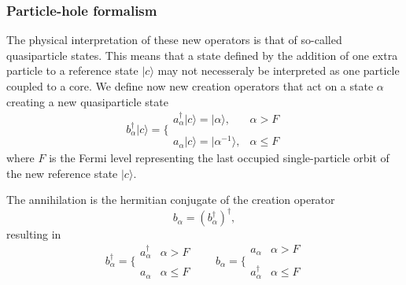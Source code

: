 \documentclass{beamer}
\begin{document}
\begin{frame}
\frametitle{Particle-hole formalism}

\begin{block}{}
The physical interpretation of these new operators is that of so-called quasiparticle states.
This means that a state defined by the addition of one extra particle to a reference state $|c\rangle $ may not necesseraly be interpreted as one particle coupled to a core.
We define now new creation operators that act on a state $\alpha$ creating a new quasiparticle state
\begin{equation}
	b_\alpha^\dagger|c\rangle  = \Bigg\{ \begin{array}{ll}
		a_\alpha^\dagger |c\rangle  = |\alpha\rangle, & \alpha > F \\
		\\
		a_\alpha |c\rangle  = |\alpha^{-1}\rangle, & \alpha \leq F
	\end{array} \label{eq:2-52}
\end{equation}
where $F$ is the Fermi level representing the last  occupied single-particle orbit 
of the new reference state $|c\rangle $. 


The annihilation is the hermitian conjugate of the creation operator
\[
	b_\alpha = (b_\alpha^\dagger)^\dagger,
\]
resulting in
\begin{equation}
	b_\alpha^\dagger = \Bigg\{ \begin{array}{ll}
		a_\alpha^\dagger & \alpha > F \\
		\\
		a_\alpha & \alpha \leq F
	\end{array} \qquad 
	b_\alpha = \Bigg\{ \begin{array}{ll}
		a_\alpha & \alpha > F \\
		\\
		 a_\alpha^\dagger & \alpha \leq F
	\end{array} \label{eq:2-54}
\end{equation}
\end{block}
\end{frame}
\end{document}
